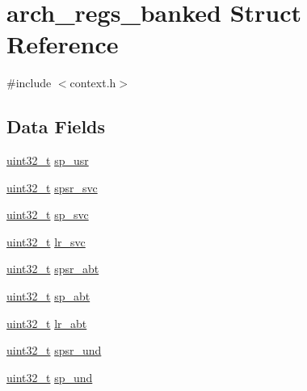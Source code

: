 \hypertarget{structarch__regs__banked}{\section{arch\-\_\-regs\-\_\-banked \-Struct \-Reference}
\label{structarch__regs__banked}
}


{\ttfamily \#include $<$context.\-h$>$}

\subsection*{\-Data \-Fields}
\begin{DoxyCompactItemize}
\item 
\hyperlink{arch__types_8h_a435d1572bf3f880d55459d9805097f62}{uint32\-\_\-t} \hyperlink{structarch__regs__banked_ab0c3d0a7fb315b79b4d6214743b5b082}{sp\-\_\-usr}
\item 
\hyperlink{arch__types_8h_a435d1572bf3f880d55459d9805097f62}{uint32\-\_\-t} \hyperlink{structarch__regs__banked_ae6da0f77fc42b43bfc0be39e8e5da763}{spsr\-\_\-svc}
\item 
\hyperlink{arch__types_8h_a435d1572bf3f880d55459d9805097f62}{uint32\-\_\-t} \hyperlink{structarch__regs__banked_a1d0fa26522eac23d880de2722023522d}{sp\-\_\-svc}
\item 
\hyperlink{arch__types_8h_a435d1572bf3f880d55459d9805097f62}{uint32\-\_\-t} \hyperlink{structarch__regs__banked_a4e9874b76913bbabf160a5a855581bbc}{lr\-\_\-svc}
\item 
\hyperlink{arch__types_8h_a435d1572bf3f880d55459d9805097f62}{uint32\-\_\-t} \hyperlink{structarch__regs__banked_ac5fcf632140189c2cf143162a8388135}{spsr\-\_\-abt}
\item 
\hyperlink{arch__types_8h_a435d1572bf3f880d55459d9805097f62}{uint32\-\_\-t} \hyperlink{structarch__regs__banked_a6ed5ed1e9e6a1e54a4a720269edfee5e}{sp\-\_\-abt}
\item 
\hyperlink{arch__types_8h_a435d1572bf3f880d55459d9805097f62}{uint32\-\_\-t} \hyperlink{structarch__regs__banked_a849c08959c26885f666f8adfae89aaf9}{lr\-\_\-abt}
\item 
\hyperlink{arch__types_8h_a435d1572bf3f880d55459d9805097f62}{uint32\-\_\-t} \hyperlink{structarch__regs__banked_a23e21972e22c7e1c44c75a47e4d6443a}{spsr\-\_\-und}
\item 
\hyperlink{arch__types_8h_a435d1572bf3f880d55459d9805097f62}{uint32\-\_\-t} \hyperlink{structarch__regs__banked_a184486e6dbb8bf48fd4d4675fb4040e4}{sp\-\_\-und}

\end{DoxyCompactItemize}

